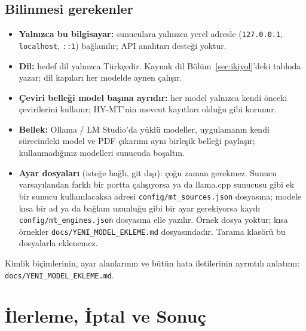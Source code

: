 \documentclass[11pt,a4paper]{article}
\newcommand{\dosya}[1]{\texttt{#1}}
\begin{document}
\subsection{Bilinmesi gerekenler}
\begin{itemize}
  \item \textbf{Yalnızca bu bilgisayar:} sunuculara yalnızca yerel adresle
        (\dosya{127.0.0.1}, \dosya{localhost}, \dosya{::1}) bağlanılır; API
        anahtarı desteği yoktur.
  \item \textbf{Dil:} hedef dil yalnızca Türkçedir. Kaynak dil
        Bölüm~\ref{sec:ikiyol}'deki tabloda yazar; dil kapıları her modelde
        aynen çalışır.
  \item \textbf{Çeviri belleği model başına ayrıdır:} her model yalnızca
        kendi önceki çevirilerini kullanır; HY-MT'nin mevcut kayıtları olduğu
        gibi korunur.
  \item \textbf{Bellek:} Ollama / LM Studio'da yüklü modeller, uygulamanın
        kendi sürecindeki model ve PDF çıkarımı aynı birleşik belleği
        paylaşır; kullanmadığınız modelleri sunucuda boşaltın.
  \item \textbf{Ayar dosyaları} (isteğe bağlı, git dışı): çoğu zaman
        gerekmez. Sunucu varsayılandan farklı bir portta çalışıyorsa ya da
        llama.cpp sunucusu gibi ek bir sunucu kullanılacaksa adresi
        \dosya{config/\allowbreak mt\_sources.json} dosyasına; modele kısa
        bir ad ya da bağlam uzunluğu gibi bir ayar gerekiyorsa kaydı
        \dosya{config/\allowbreak mt\_engines.json} dosyasına elle yazılır.
        Örnek dosya yoktur; kısa örnekler
        \dosya{docs/\allowbreak YENI\_MODEL\_EKLEME.md} dosyasındadır.
        Tarama klasörü bu dosyalarla eklenemez.
\end{itemize}

Kimlik biçimlerinin, ayar alanlarının ve bütün hata iletilerinin ayrıntılı
anlatımı: \dosya{docs/\allowbreak YENI\_MODEL\_EKLEME.md}.

\section{İlerleme, İptal ve Sonuç}
\end{document}
